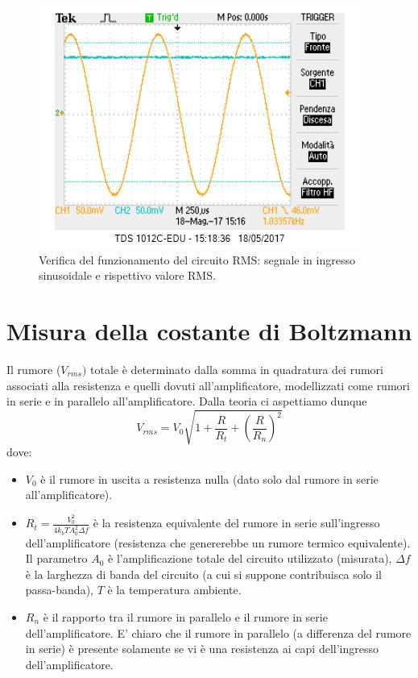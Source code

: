 \documentclass[10pt,a4paper]{article}
\begin{document}
\begin{figure}[!htb]
\centering
\includegraphics[scale=0.7]{vrms.jpg}
\caption{Verifica del funzionamento del circuito RMS: segnale in ingresso sinusoidale e rispettivo valore RMS.\label{rms}}
\end{figure}

\section{Misura della costante di Boltzmann}

Il rumore ($V_{rms})$ totale è determinato dalla somma in quadratura dei rumori associati alla resistenza e quelli dovuti all'amplificatore, modellizzati come rumori in serie e in parallelo all'amplificatore. Dalla teoria ci aspettiamo dunque 
\begin{equation}
V_{rms} = V_0 \sqrt{1+\frac{R}{R_t}+ \left( \frac{R}{R_n} \right) ^2}
\end{equation}
dove:
\begin{itemize}
\item $V_0$ è il rumore in uscita a resistenza nulla (dato solo dal rumore in serie all'amplificatore).
\item $R_t = \frac{V_0^2}{4 k_b T A_0^2 \Delta f}$ è la resistenza equivalente del rumore in serie sull'ingresso dell'amplificatore (resistenza che genererebbe un rumore termico equivalente). Il parametro $A_0$ è l'amplificazione totale del circuito utilizzato (misurata), $\Delta f$ è la larghezza di banda del circuito (a cui si suppone contribuisca solo il passa-banda), $T$ è la temperatura ambiente.\\
\item $R_n$ è il rapporto tra il rumore in parallelo e il rumore in serie dell'amplificatore. E' chiaro che il rumore in parallelo (a differenza del rumore in serie) è presente solamente se vi è una resistenza ai capi dell'ingresso dell'amplificatore.%
\end{itemize}
\end{document}
